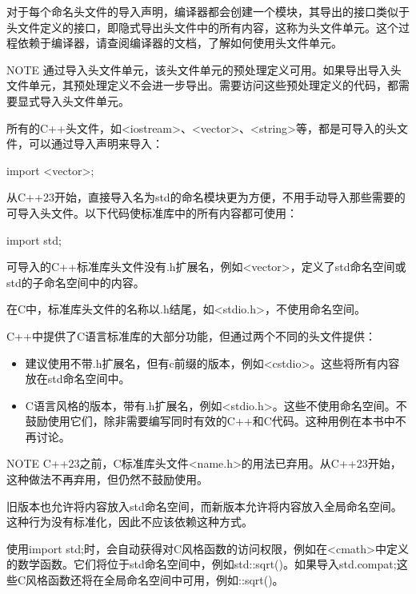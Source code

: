 对于每个命名头文件的导入声明，编译器都会创建一个模块，其导出的接口类似于头文件定义的接口，即隐式导出头文件中的所有内容，这称为头文件单元。这个过程依赖于编译器，请查阅编译器的文档，了解如何使用头文件单元。

\begin{myNotic}{NOTE}
通过导入头文件单元，该头文件单元的预处理定义可用。如果导出导入头文件单元，其预处理定义不会进一步导出。需要访问这些预处理定义的代码，都需要显式导入头文件单元。
\end{myNotic}


所有的C++头文件，如<iostream>、<vector>、<string>等，都是可导入的头文件，可以通过导入声明来导入：

\begin{cpp}
import <vector>;
\end{cpp}

从C++23开始，直接导入名为std的命名模块更为方便，不用手动导入那些需要的可导入头文件。以下代码使标准库中的所有内容都可使用：

\begin{cpp}
import std;
\end{cpp}

可导入的C++标准库头文件没有.h扩展名，例如<vector>，定义了std命名空间或std的子命名空间中的内容。

在C中，标准库头文件的名称以.h结尾，如<stdio.h>，不使用命名空间。

C++中提供了C语言标准库的大部分功能，但通过两个不同的头文件提供：

\begin{itemize}
\item
建议使用不带.h扩展名，但有c前缀的版本，例如<cstdio>。这些将所有内容放在std命名空间中。

\item
C语言风格的版本，带有.h扩展名，例如<stdio.h>。这些不使用命名空间。不鼓励使用它们，除非需要编写同时有效的C++和C代码。这种用例在本书中不再讨论。
\end{itemize}

\begin{myNotic}{NOTE}
C++23之前，C标准库头文件<name.h>的用法已弃用。从C++23开始，这种做法不再弃用，但仍然不鼓励使用。
\end{myNotic}

旧版本也允许将内容放入std命名空间，而新版本允许将内容放入全局命名空间。这种行为没有标准化，因此不应该依赖这种方式。

使用import std;时，会自动获得对C风格函数的访问权限，例如在<cmath>中定义的数学函数。它们将位于std命名空间中，例如std::sqrt()。如果导入std.compat;这些C风格函数还将在全局命名空间中可用，例如::sqrt()。

